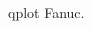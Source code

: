 \documentclass[a4paper,12pt]{article}
\begin{document}
\begin{figure}[H]
    \centering
    \begin{adjustbox}{scale = 0.65, max width=\columnwidth}
    \end{adjustbox}
    \caption{qplot Fanuc.}
    \label{qplot fanucm 3}
\end{figure}




\end{document}
